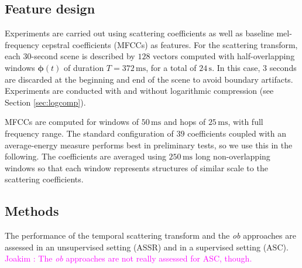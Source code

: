 \documentclass[journal]{IEEEtran}
\newcommand{\ja}[1]{\textcolor{magenta}{Joakim : #1}}
\begin{document}
\subsection{Feature design}

Experiments are carried out using scattering coefficients as well as baseline mel-frequency cepstral coefficients (MFCCs) as features. For the scattering transform, each $30$-second scene is described by $128$ vectors computed with half-overlapping windows $\boldsymbol{\phi}(t)$ of duration $T=372\,\mathrm{ms}$, for a total of $24\,\mathrm{s}$. In this case, $3$ seconds are discarded at the beginning and end of the scene to avoid boundary artifacts. Experiments are conducted with and without logarithmic compression (see Section \ref{sec:logcomp}).

MFCCs are computed for windows of $50\,\mathrm{ms}$ and hops of $25\,\mathrm{ms}$, with full frequency range. The standard configuration of $39$ coefficients coupled with an average-energy measure performs best in preliminary tests, so we use this in the following. The coefficients are averaged using $250\,\mathrm{ms}$ long non-overlapping windows so that each window represents structures of similar scale to the scattering coefficients.



\subsection{Methods}

The performance of the temporal scattering transform and the \emph{ob} approaches are assessed in an unsupervised setting (ASSR) and in a supervised setting (ASC). \ja{The \emph{ob} approaches are not really assessed for ASC, though.}
\end{document}
